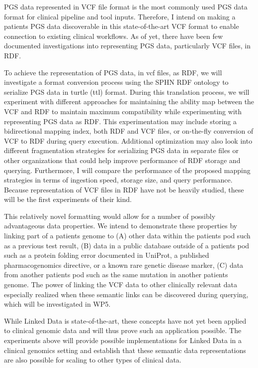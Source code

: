 \documentclass[runningheads]{llncs}
\begin{document}
PGS data represented in VCF file format is the most commonly used PGS data format for clinical pipeline and tool inputs. 
Therefore, I intend on making a patient\textquotesingle s PGS data discoverable in this state-of-the-art VCF format to enable connection to existing clinical workflows. 
As of yet, there have been few documented investigations into representing PGS data, particularly VCF files, in RDF. 

To achieve the representation of PGS data, in vcf files, as RDF, we will investigate a format conversion process using the SPHN RDF ontology \cite{van_der_horst_bridging_2023} to serialize PGS data in turtle (ttl) format. 
During this translation process, we will experiment with different approaches for maintaining the ability map between the VCF and RDF to maintain maximum compatibility while experimenting with representing PGS data as RDF. 
This experimentation may include storing a bidirectional mapping index, both RDF and VCF files, or on-the-fly conversion of VCF to RDF during query execution. 
Additional optimization may also look into different fragmentation strategies for serializing PGS data in separate files or other organizations that could help improve performance of RDF storage and querying.
Furthermore, I will compare the performance of the proposed mapping strategies in terms of ingestion speed, storage size, and query performance. 
Because representation of VCF files in RDF have not be heavily studied, these will be the first experiments of their kind.

This relatively novel formatting would allow for a number of possibly advantageous data properties. 
We intend to demonstrate these properties by linking part of a patient\textquotesingle s genome to
(A) other data within the patient\textquotesingle s pod such as a previous test result, 
(B) data in a public database outside of a patient\textquotesingle s pod such as a protein folding error documented in UniProt, a published pharmacogenomics directive, or a known rare genetic disease marker,
(C) data from another patient\textquotesingle s pod such as the same mutation in another patient\textquotesingle s genome.
The power of linking the VCF data to other clinically relevant data especially realized when these semantic links can be discovered during querying, which will be investigated in WP5. 

While Linked Data is state-of-the-art, these concepts have not yet been applied to clinical genomic data and will thus prove such an application possible. 
The experiments above will provide possible implementations for Linked Data in a clinical genomics setting and establish that these semantic data representations are also possible for scaling to other types of clinical data.
\end{document}
